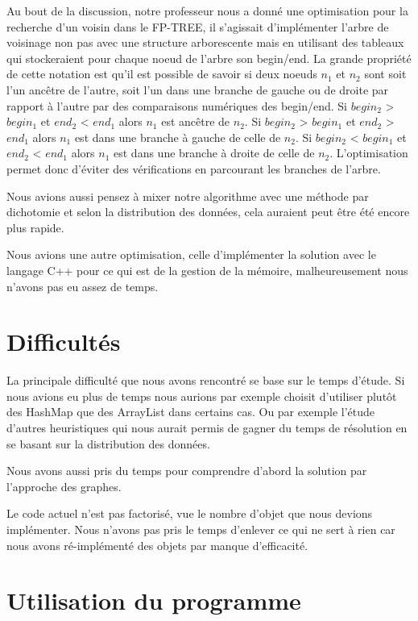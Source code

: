 \documentclass[12pt]{report}
\begin{document}
Au bout de la discussion, notre professeur nous a donné une optimisation pour la recherche d'un voisin dans le FP-TREE, il s'agissait d'implémenter l'arbre de voisinage non pas avec une structure arborescente mais en utilisant des tableaux qui stockeraient pour chaque noeud de l'arbre son begin/end. La grande propriété de cette notation est qu'il est possible de savoir si deux noeuds $n_{1}$ et $n_{2}$ sont soit l'un ancêtre de l'autre, soit l'un dans une branche de gauche ou de droite par rapport à l'autre par des comparaisons numériques des begin/end. Si $begin_{2}$ > $begin_{1}$ et $end_{2}$ < $end_{1}$ alors $n_{1}$ est ancêtre de $n_{2}$.
Si $begin_{2}$ > $begin_{1}$ et $end_{2}$ > $end_{1}$ alors $n_{1}$ est dans une branche à gauche de celle de $n_{2}$. Si $begin_{2}$ < $begin_{1}$ et $end_{2}$ < $end_{1}$ alors $n_{1}$ est dans une branche à droite de celle de $n_{2}$. L'optimisation permet donc d'éviter des vérifications en parcourant les branches de l'arbre.

Nous avions aussi pensez à mixer notre algorithme avec une méthode par dichotomie et selon la distribution des données, cela auraient peut être été encore plus rapide.

Nous avions une autre optimisation, celle d'implémenter la solution avec le langage C++ pour ce qui est de la gestion de la mémoire, malheureusement nous n'avons pas eu assez de temps.

\section{Difficultés}

La principale difficulté que nous avons rencontré se base sur le temps d'étude. Si nous avions eu plus de temps nous aurions par exemple choisit d'utiliser plutôt des HashMap que des ArrayList dans certains cas. Ou par exemple l'étude d'autres heuristiques qui nous aurait permis de gagner du temps de résolution en se basant sur la distribution des données. 

Nous avons aussi pris du temps pour comprendre d'abord la solution par l'approche des graphes.

Le code actuel n'est pas factorisé, vue le nombre d'objet que nous devions implémenter. Nous n'avons pas pris le temps d'enlever ce qui ne sert à rien car nous avons ré-implémenté des objets par manque d'efficacité.


\section{Utilisation du programme}
\end{document}
